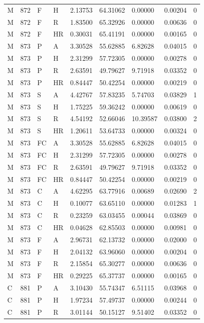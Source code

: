 \begin{longtable}{lllllllll}
M & 872 & F & H & 2.13753 & 64.31062 & 0.00000 & 0.00204 & 0\\
M & 872 & F & R & 1.83500 & 65.32926 & 0.00000 & 0.00636 & 0\\
M & 872 & F & HR & 0.30031 & 65.41191 & 0.00000 & 0.00165 & 0\\
M & 873 & P & A & 3.30528 & 55.62885 & 6.82628 & 0.04015 & 0\\
M & 873 & P & H & 2.31299 & 57.72305 & 0.00000 & 0.00278 & 0\\
M & 873 & P & R & 2.63591 & 49.79627 & 9.71918 & 0.03352 & 0\\
M & 873 & P & HR & 0.84447 & 50.42254 & 0.00000 & 0.00219 & 0\\
M & 873 & S & A & 4.42767 & 57.83235 & 5.74703 & 0.03829 & 1\\
M & 873 & S & H & 1.75225 & 59.36242 & 0.00000 & 0.00619 & 0\\
M & 873 & S & R & 4.54192 & 52.66046 & 10.39587 & 0.03800 & 2\\
M & 873 & S & HR & 1.20611 & 53.64733 & 0.00000 & 0.00324 & 0\\
M & 873 & FC & A & 3.30528 & 55.62885 & 6.82628 & 0.04015 & 0\\
M & 873 & FC & H & 2.31299 & 57.72305 & 0.00000 & 0.00278 & 0\\
M & 873 & FC & R & 2.63591 & 49.79627 & 9.71918 & 0.03352 & 0\\
M & 873 & FC & HR & 0.84447 & 50.42254 & 0.00000 & 0.00219 & 0\\
M & 873 & C & A & 4.62295 & 63.77916 & 0.00689 & 0.02690 & 2\\
M & 873 & C & H & 0.10077 & 63.65110 & 0.00000 & 0.01283 & 1\\
M & 873 & C & R & 0.23259 & 63.03455 & 0.00044 & 0.03869 & 0\\
M & 873 & C & HR & 0.04628 & 62.85503 & 0.00000 & 0.00981 & 0\\
M & 873 & F & A & 2.96731 & 62.13732 & 0.00000 & 0.02000 & 0\\
M & 873 & F & H & 2.04132 & 63.96060 & 0.00000 & 0.00204 & 0\\
M & 873 & F & R & 2.15854 & 65.30277 & 0.00000 & 0.00636 & 0\\
M & 873 & F & HR & 0.29225 & 65.37737 & 0.00000 & 0.00165 & 0\\
C & 881 & P & A & 3.10430 & 55.74347 & 6.51115 & 0.03968 & 0\\
C & 881 & P & H & 1.97234 & 57.49737 & 0.00000 & 0.00244 & 0\\
C & 881 & P & R & 3.01144 & 50.15127 & 9.51402 & 0.03352 & 0\\

\end{longtable}
